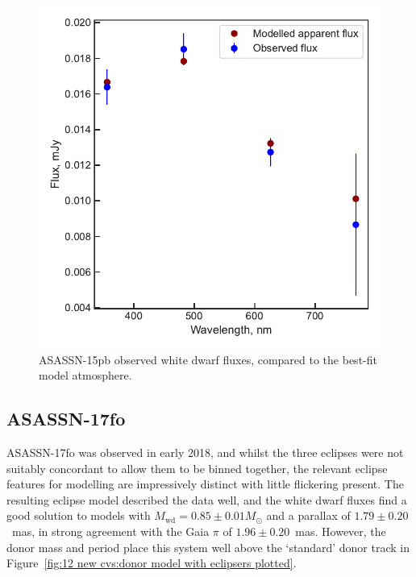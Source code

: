 \begin{figure}
    \centering
    \includegraphics[width=\textwidth]{figures/results/ASASSN-15pb/fluxplot.pdf}
    \caption{ASASSN-15pb observed white dwarf fluxes, compared to the best-fit model atmosphere.}
    \label{fig:ASASSN-15pb flux plot}
\end{figure}
\clearpage


\newpage
\subsection{ASASSN-17fo}

ASASSN-17fo was observed in early 2018, and whilst the three eclipses were not suitably concordant to allow them to be binned together, the relevant eclipse features for modelling are impressively distinct with little flickering present. The resulting eclipse model described the data well, and the white dwarf fluxes find a good solution to models with $M_\mathrm{wd} = 0.85\pm0.01 M_\odot$ and a parallax of $1.79\pm0.20$~mas, in strong agreement with the Gaia $\pi$ of $1.96 \pm 0.20$~mas. However, the donor mass and period place this system well above the `standard' \citet{knigge11} donor track in Figure~\ref{fig:12 new cvs:donor model with eclipsers plotted}.


%     

